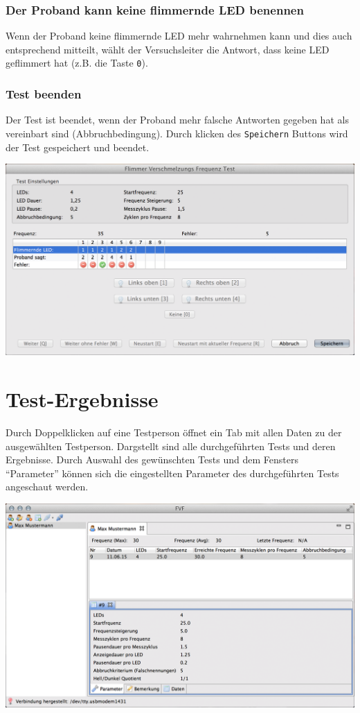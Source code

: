 \documentclass[11pt,accentcolor=tud2a,colorback,noheadingspace]{tudreport}
\begin{document}
\subsection{Der Proband kann keine flimmernde LED benennen}
\label{tests:der-proband-kann-keine-flimmernde-led-benennen}
Wenn der Proband keine flimmernde LED mehr wahrnehmen kann und dies auch entsprechend mitteilt, wählt der Versuchsleiter die Antwort, dass keine LED geflimmert hat (z.B. die Taste \texttt{0}).


\subsection{Test beenden}
\label{tests:test-beenden}
Der Test ist beendet, wenn der Proband mehr falsche Antworten gegeben hat als vereinbart sind (Abbruchbedingung). Durch klicken des \texttt{Speichern} Buttons wird der Test gespeichert und beendet.

\includegraphics[width=\textwidth]{testrunner_finished.png}


\chapter{Test-Ergebnisse}
\label{results:test-ergebnisse}\label{results::doc}
Durch Doppelklicken auf eine Testperson öffnet ein Tab mit allen Daten zu der ausgewählten Testperson.
Dargstellt sind alle durchgeführten Tests und deren Ergebnisse. Durch Auswahl des gewünschten Tests und dem Fensters ``Parameter'' können sich die eingestellten Parameter des durchgeführten Tests angeschaut werden.

\includegraphics[width=\textwidth]{results_parameter.png}
\end{document}
